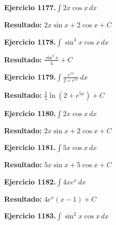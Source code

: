 \documentclass[10pt,a4paper]{article}
\begin{document}
\newpage
\begin{ejbox}
\textbf{Ejercicio 1177.}\quad $\int 2x \cos x\,dx$
\end{ejbox}

\begin{solbox}
\textbf{Resultado:} \(\displaystyle 2x\sin x + 2\cos x + C\)
\end{solbox}

\begin{ejbox}
\textbf{Ejercicio 1178.}\quad $\int \sin^{3}x \cos x\,dx$
\end{ejbox}

\begin{solbox}
\textbf{Resultado:} \(\displaystyle \frac{\sin^{4}x}{4} + C\)
\end{solbox}

\begin{ejbox}
\textbf{Ejercicio 1179.}\quad $\int \frac{e^{5x}}{2+e^{5x}}\,dx$
\end{ejbox}

\begin{solbox}
\textbf{Resultado:} \(\displaystyle \frac{1}{5}\ln(2+e^{5x}) + C\)
\end{solbox}

\newpage
\begin{ejbox}
\textbf{Ejercicio 1180.}\quad $\int 2x \cos x\,dx$
\end{ejbox}

\begin{solbox}
\textbf{Resultado:} \(\displaystyle 2x\sin x + 2\cos x + C\)
\end{solbox}

\begin{ejbox}
\textbf{Ejercicio 1181.}\quad $\int 5x \cos x\,dx$
\end{ejbox}

\begin{solbox}
\textbf{Resultado:} \(\displaystyle 5x\sin x + 5\cos x + C\)
\end{solbox}

\begin{ejbox}
\textbf{Ejercicio 1182.}\quad $\int 4x e^{x}\,dx$
\end{ejbox}

\begin{solbox}
\textbf{Resultado:} \(\displaystyle 4e^x(x-1) + C\)
\end{solbox}

\newpage
\begin{ejbox}
\textbf{Ejercicio 1183.}\quad $\int \sin^{2}x \cos x\,dx$
\end{ejbox}
\end{document}

